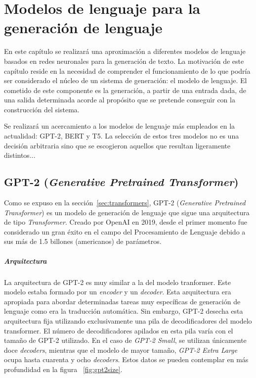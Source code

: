 \chapter{Modelos de lenguaje para la generación de lenguaje}
\label{cap:ML_nlg}

En este capítulo se realizará una aproximación a  diferentes modelos de lenguaje basados en redes neuronales para la generación de texto. La motivación de este capítulo reside en la necesidad de comprender el funcionamiento de lo que podría ser considerado el núcleo de un sistema de generación: el modelo de lenguaje.
El cometido de este componente es la generación, a partir de una entrada dada, de una salida determinada acorde al propósito que se pretende conseguir con la construcción del sistema. 

Se realizará un acercamiento a los modelos de lenguaje más empleados en la actualidad: GPT-2, BERT y T5. La selección de estos tres modelos no es una decisión arbitraria sino que se escogieron aquellos que resultan ligeramente distintos... %

\section{GPT-2 (\textit{Generative Pretrained Transformer})}
Como se expuso en la sección~\ref{sec:transformers}, GPT-2 (\textit{Generative Pretrained Transformer}) es un modelo de generación de lenguaje que sigue una arquitectura de tipo \textit{Transformer}. Creado por OpenAI en 2019, desde el primer momento fue considerado un gran éxito en el campo del Procesamiento de Lenguaje debido a sus más de 1.5 billones (americanos) de parámetros.

\paragraph{Arquitectura}\hfill


La arquitectura de GPT-2 es muy similar a la del modelo tranformer. Este modelo estaba formado por un \textit{encoder} y un \textit{decoder}. Esta arquitectura era apropiada para abordar determinadas tareas muy específicas de generación de lenguaje como era la traducción automática. Sin embargo, GPT-2 desecha esta arquitectura fija utilizando exclusivamente una pila de decodificadores del modelo transformer. El número de decodificadores apilados en esta pila varía con el tamaño de GPT-2 utilizado. En el caso de \textit{GPT-2 Small}, se utilizan únicamente doce \textit{decoders}, mientras que el modelo de mayor tamaño, \textit{GPT-2 Extra Large} ocupa hasta cuarenta y ocho \textit{decoders}. Estos datos se pueden contemplar en más profundidad en la figura ~\ref{fig:gpt2size}.



